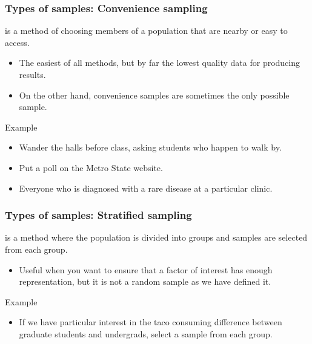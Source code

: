 \documentclass[xcolor=table, aspectratio=169, bigger, handout]{beamer}
\begin{document}
\begin{frame}
\frametitle{Types of samples: Convenience sampling}

\begin{block}{}
 is a method of choosing members of a population that are nearby or easy to access.
\begin{itemize}
\item The easiest of all methods, but by far the lowest quality data for producing results.
\item On the other hand, convenience samples are sometimes the only possible sample.
\end{itemize}
\end{block}
\pause
\begin{exampleblock}{Example}
\begin{itemize}
\item Wander the halls before class, asking students who happen to walk by.
\item Put a poll on the Metro State website.
\item Everyone who is diagnosed with a rare disease at a particular clinic.
\end{itemize}

\end{exampleblock}
\end{frame}

\begin{frame}
\frametitle{Types of samples: Stratified sampling}

\begin{block}{}
 is a method where the population is divided into groups and samples are selected from each group.
\begin{itemize}
\item Useful when you want to ensure that a factor of interest has enough representation, but it is not a random sample as we have defined it.
\end{itemize}
\end{block}
\pause
\begin{exampleblock}{Example}
\begin{itemize}
\item If we have particular interest in the taco consuming difference between graduate students and undergrads, select a sample from each group.
\end{itemize}
\end{exampleblock}
\end{frame}
\end{document}
